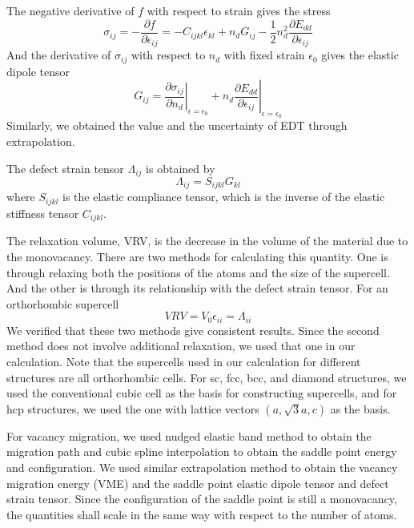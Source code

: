 \documentclass[%
 reprint,
 amsmath,amssymb,
 aps,
]{revtex4-1}
\begin{document}
The negative derivative of $f$ with respect to strain gives the stress
\begin{equation}
  \label{eq:stress}
  \sigma_{ij} = -\frac{\partial f}{\partial \epsilon_{ij}}
  = -C_{ijkl}\epsilon_{kl} + n_dG_{ij} - \frac{1}{2}n_d^2\frac{\partial E_{dd}}{\partial \epsilon_{ij}}
\end{equation}
And the derivative of $\sigma_{ij}$ with respect to $n_d$ with fixed strain $\epsilon_0$ gives the elastic dipole tensor
\begin{equation}
  \label{eq:EDT}
  G_{ij} = \left.\frac{\partial \sigma_{ij}}{\partial n_d}\right|_{\epsilon = \epsilon_0}
  + n_d \left.\frac{\partial E_{dd}}{\partial \epsilon_{ij}}\right|_{\epsilon = \epsilon_0}
\end{equation}
Similarly, we obtained the value and the uncertainty of EDT through extrapolation.

The defect strain tensor $\Lambda_{ij}$ is obtained by
\begin{equation}
  \label{eq:DST}
  \Lambda_{ij} = S_{ijkl} G_{kl}
\end{equation}
where $S_{ijkl}$ is the elastic compliance tensor, which is the inverse of the elastic stiffness tensor $C_{ijkl}$.

The relaxation volume, VRV, is the decrease in the volume of the material due to the monovacancy.
There are two methods for calculating this quantity.
One is through relaxing both the positions of the atoms and the size of the supercell.
And the other is through its relationship with the defect strain tensor.
For an orthorhombic supercell
\begin{equation}
  \label{eq:VRV}
  \mathit{VRV} = V_0\epsilon_{ii} = \Lambda_{ii}
\end{equation}
We verified that these two methods give consistent results.
Since the second method does not involve additional relaxation, we used that one in our calculation.
Note that the supercells used in our calculation for different structures are all orthorhombic cells.
For sc, fcc, bcc, and diamond structures, we used the conventional cubic cell as the basis for constructing supercells, and for hcp structures, we used the one with lattice vectors $(a, \sqrt{3}a, c)$ as the basis.

For vacancy migration, we used nudged elastic band method to obtain the migration path and cubic spline interpolation to obtain the saddle point energy and configuration.
We used similar extrapolation method to obtain the vacancy migration energy (VME) and the saddle point elastic dipole tensor and defect strain tensor.
Since the configuration of the saddle point is still a monovacancy, the quantities shall scale in the same way with respect to the number of atoms.
\end{document}
